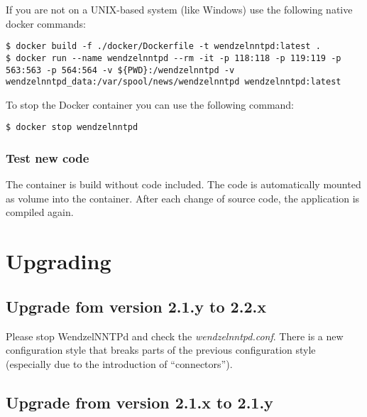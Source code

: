 \documentclass[12pt,fleqn,leqno]{scrbook}
\begin{document}
If you are not on a UNIX-based system (like Windows) use the following
native docker commands:

\begin{verbatim}
$ docker build -f ./docker/Dockerfile -t wendzelnntpd:latest .
$ docker run --name wendzelnntpd --rm -it -p 118:118 -p 119:119 -p 563:563 -p 564:564 -v ${PWD}:/wendzelnntpd -v wendzelnntpd_data:/var/spool/news/wendzelnntpd wendzelnntpd:latest
\end{verbatim}

To stop the Docker container you can use the following command:

\begin{verbatim}
$ docker stop wendzelnntpd
\end{verbatim}

\hypertarget{test-new-code-1}{%
\subsubsection{Test new code}\label{test-new-code-1}}

The container is build without code included. The code is automatically
mounted as volume into the container. After each change of source code,
the application is compiled again.

\hypertarget{upgrading}{%
\section{Upgrading}\label{upgrading}}

\protect\hypertarget{Ch:Upgrade}{}{}

\hypertarget{upgrade-fom-version-2.1.y-to-2.2.x}{%
\subsection{Upgrade fom version 2.1.y to
2.2.x}\label{upgrade-fom-version-2.1.y-to-2.2.x}}

Please stop WendzelNNTPd and check the \emph{wendzelnntpd.conf}. There
is a new configuration style that breaks parts of the previous
configuration style (especially due to the introduction of
``connectors'').

\hypertarget{upgrade-from-version-2.1.x-to-2.1.y}{%
\subsection{Upgrade from version 2.1.x to
2.1.y}\label{upgrade-from-version-2.1.x-to-2.1.y}}
\end{document}
